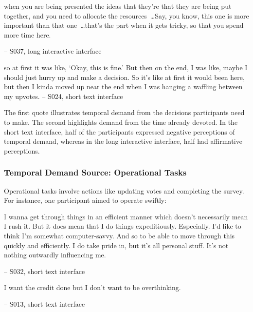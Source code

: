 \begin{displayquote}
\bracketellipsis when you are being presented the ideas that they're that they are being put together, and you need to allocate the resources~\ldots Say, you know, this one is more important than that one~\ldots that's the part when it gets tricky, so that you spend more time here. 
    
\noindent \hfill -- S037, long interactive interface
\end{displayquote}

\begin{displayquote}
\bracketellipsis so at first it was like, `Okay, this is fine.' But then on the end, I was like, maybe I should just hurry up and make a decision. So it's like at first it would been here, but then I kinda moved up near the end when I was hanging a waffling between my upvotes.
\noindent \hfill -- S024, short text interface
\end{displayquote}

The first quote illustrates temporal demand from the decisions participants need to make. The second highlights demand from the time already devoted. In the short text interface, half of the participants expressed negative perceptions of temporal demand, whereas in the long interactive interface, half had affirmative perceptions.

\subsubsection{Temporal Demand Source: Operational Tasks}
Operational tasks involve actions like updating votes and completing the survey. For instance, one participant aimed to operate swiftly:

\begin{displayquote}
I wanna get through things in an efficient manner which doesn't necessarily mean I rush it. But it does mean that I do things expeditiously. Especially. I'd like to think I'm somewhat computer-savvy. And so to be able to move through this quickly and efficiently. I do take pride in, but it's all personal stuff. It's not nothing outwardly influencing me. 
        
\noindent \hfill -- S032, short text interface
\end{displayquote}

\begin{displayquote}
I want the credit done but I don't want to be overthinking.
            
\noindent \hfill -- S013, short text interface
\end{displayquote}

